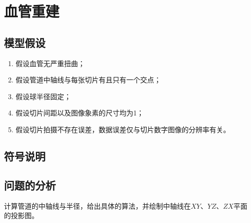 \section{血管重建}
    \subsection{模型假设}
        \begin{enumerate}
        \item 假设血管无严重扭曲；
        \item 假设管道中轴线与每张切片有且只有一个交点；
        \item 假设球半径固定；
        \item 假设切片间距以及图像象素的尺寸均为1；
        \item 假设切片拍摄不存在误差，数据误差仅与切片数字图像的分辨率有关。
        \end{enumerate}
    \subsection{符号说明}
    \subsection{问题的分析}
        \par
        计算管道的中轴线与半径，给出具体的算法，并绘制中轴线在$XY$、$YZ$、$ZX$平面的投影图。
